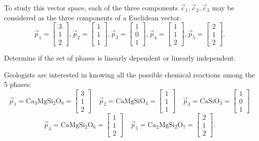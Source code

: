 \begin{applicationActivities}
\begin{activity}{5}
To study this vector space, each of the three components \(\vec c_1,\vec c_2,\vec c_3\) may be considered
as the three components of a Euclidean vector.
\[ \vec{p}_1 = \begin{bmatrix} 3 \\ 1 \\ 2 \end{bmatrix},
\vec{p}_2 = \begin{bmatrix} 1 \\ 1 \\ 1 \end{bmatrix},
\vec{p}_3 = \begin{bmatrix} 1 \\ 0 \\ 1 \end{bmatrix},
\vec{p}_4 = \begin{bmatrix} 1 \\ 1 \\ 2 \end{bmatrix},
\vec{p}_5 = \begin{bmatrix} 2 \\ 1 \\ 2 \end{bmatrix}.\]

Determine if the set of phases is linearly dependent or linearly independent.
\end{activity}

\begin{activity}{15}
Geologists are interested in knowing all the possible chemical reactions among the 5 phases:
\[ \vec{p}_1 = \mathrm{Ca_3MgSi_2O_8} = \begin{bmatrix} 3 \\ 1 \\ 2 \end{bmatrix} \hspace{1em}
\vec{p}_2 = \mathrm{CaMgSiO_4} = \begin{bmatrix} 1 \\ 1 \\ 1 \end{bmatrix} \hspace{1em}
\vec{p}_3 = \mathrm{CaSiO_3} =  \begin{bmatrix} 1 \\ 0 \\ 1 \end{bmatrix}\]
\[\vec{p}_4 = \mathrm{CaMgSi_2O_6} = \begin{bmatrix} 1 \\ 1 \\ 2 \end{bmatrix} \hspace{1em}
\vec{p}_5 = \mathrm{Ca_2MgSi_2O_7} = \begin{bmatrix} 2 \\ 1 \\ 2 \end{bmatrix}.\]


\end{activity}
\end{applicationActivities}
